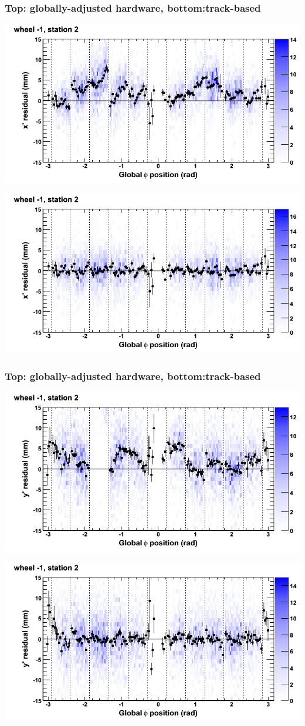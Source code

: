\documentclass[compress]{beamer}
\begin{document}
\begin{frame}
\frametitle{Top: globally-adjusted hardware, bottom:track-based}
\includegraphics[width=0.7\linewidth]{NOV4_mapplots_HW/DTvsphi_st2whB_x.png}

\includegraphics[width=0.7\linewidth]{NOV4_mapplots/DTvsphi_st2whB_x.png}
\end{frame}

\begin{frame}
\frametitle{Top: globally-adjusted hardware, bottom:track-based}
\includegraphics[width=0.7\linewidth]{NOV4_mapplots_HW/DTvsphi_st2whB_y.png}

\includegraphics[width=0.7\linewidth]{NOV4_mapplots/DTvsphi_st2whB_y.png}
\end{frame}
\end{document}
